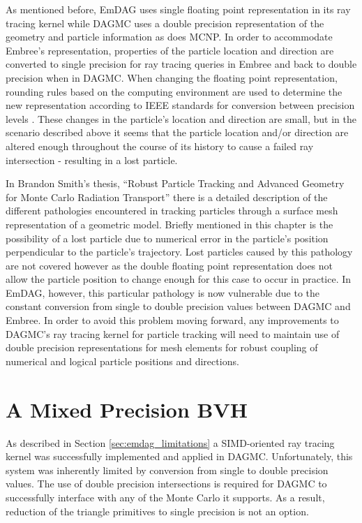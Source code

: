 As mentioned before, EmDAG uses single floating point representation in its ray
tracing kernel while DAGMC uses a double precision representation of the
geometry and particle information as does MCNP. In order to accommodate Embree's
representation, properties of the particle location and direction are converted
to single precision for ray tracing queries in Embree and back to double
precision when in DAGMC. When changing the floating point representation,
rounding rules based on the computing environment are used to determine the new
representation according to IEEE standards for conversion between precision
levels \cite{IEEE_STD_2008}. These changes in the particle's location and
direction are small, but in the scenario described above it seems that the
particle location and/or direction are altered enough throughout the course of
its history to cause a failed ray intersection - resulting in a lost particle.

In Brandon Smith's thesis, ``Robust Particle Tracking and Advanced Geometry for
Monte Carlo Radiation Transport'' \cite{Smith_2011} there is a detailed
description of the different pathologies encountered in tracking particles
through a surface mesh representation of a geometric model. Briefly mentioned in
this chapter is the possibility of a lost particle due to numerical error in the
particle's position perpendicular to the particle's trajectory. Lost particles
caused by this pathology are not covered however as the double floating point
representation does not allow the particle position to change enough for this
case to occur in practice. In EmDAG, however, this particular pathology is now
vulnerable due to the constant conversion from single to double precision values
between DAGMC and Embree. In order to avoid this problem moving forward, any
improvements to DAGMC's ray tracing kernel for particle tracking will need to
maintain use of double precision representations for mesh elements for robust
coupling of numerical and logical particle positions and directions.

\section{A Mixed Precision BVH}

As described in Section \ref{sec:emdag_limitations} a SIMD-oriented ray tracing
kernel was successfully implemented and applied in DAGMC. Unfortunately, this
system was inherently limited by conversion from single to double precision
values. The use of double precision intersections is required for DAGMC to
successfully interface with any of the Monte Carlo it supports. As a result,
reduction of the triangle primitives to single precision is not an option.


